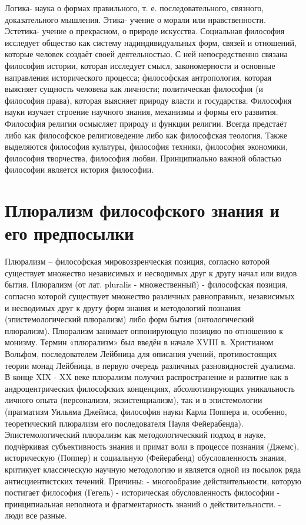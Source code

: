 \documentclass[12pt]{article}
\begin{document}
Логика- наука о формах правильного, т. е. последовательного, связного, доказательного мышления.
Этика- учение о морали или нравственности.
Эстетика- учение о прекрасном, о природе искусства.
Социальная  философия  исследует  общество  как  систему  надиндивидуальных  форм,  связей  и  отношений,
которые человек создаёт своей деятельностью. С ней непосредственно связана философия истории, которая
исследует  смысл,  закономерности  и  основные  направления  исторического  процесса;  философская
антропология,  которая  выясняет  сущность  человека  как  личности;  политическая  философия  (и  философия
права), которая выясняет природу власти и государства. Философия науки изучает строение научного знания,
механизмы  и  формы  его  развития.  Философия  религии  осмысляет  природу  и  функции  религии.  Всегда
предстаёт  либо  как  философское  религиоведение  либо  как  философская  теология.  Также  выделяются
философия культуры, философия техники, философия экономики, философия творчества, философия любви. 
Принципиально важной областью философии является история философии.

\newpage
\section{Плюрализм философского знания и его предпосылки}
Плюрализм – философская мировоззренческая позиция, согласно которой существует множество независимых
и несводимых друг к другу начал или видов бытия. 
Плюрализм (от лат. pluralis - множественный) - философская позиция, согласно которой существует множество
различных равноправных,  независимых и несводимых друг к другу форм знания и методологий познания
(эпистемологический  плюрализм)  либо  форм  бытия  (онтологический  плюрализм).  Плюрализм  занимает
оппонирующую позицию по отношению к монизму. 
Термин  «плюрализм»  был  введён  в  начале  XVIII  в.  Христианом  Вольфом,  последователем  Лейбница  для
описания  учений,  противостоящих  теории  монад  Лейбница,  в  первую  очередь  различных  разновидностей
дуализма.
В конце XIX - XX веке плюрализм получил распространение и развитие как в андроцентрических философских
конценциях,  абсолютизирующих  уникальность  личного  опыта  (персонализм,  экзистенциализм),  так  и  в
эпистемологии (прагматизм Уильяма Джеймса, философия науки Карла Поппера и, особенно, теоретический
плюрализм его последователя Пауля Фейерабенда).
Эпистемологический плюрализм как методологическкий подход в науке, подчёркивая субъективность знания и
примат  воли  в  процессе  познания  (Джемс),  историческую  (Поппер)  и  социальную  (Фейерабенд)
обусловленность знания, критикует классическую научную методологию и является одной из посылок ряда
антисциентистских течений.
Причины:
- многообразие действительности, которую постигает философия (Гегель)
- историческая обусловленность философии
- принципиальная неполнота и фрагментарность знаний о действительности.
- люди все разные.
\end{document}
